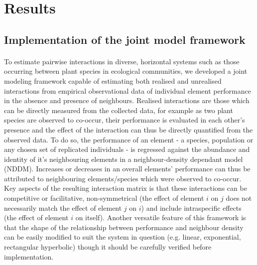 \documentclass[a4,12pt]{article}
\begin{document}
\section{Results}


    \subsection{Implementation of the joint model framework}

    \paragraph{}
        To estimate pairwise interactions in diverse, horizontal systems such as those occurring between plant species in ecological communities, we developed a joint modeling framework capable of estimating both realised and unrealised interactions from empirical observational data of individual element performance in the absence and presence of neighbours. Realised interactions are those which can be directly measured from the collected data, for example as two plant species are observed to co-occur, their performance is evaluated in each other's presence and the effect of the interaction can thus be directly quantified from the observed data. To do so, the performance of an element - a species, population or any chosen set of replicated individuals - is regressed against the abundance and identity of it's neighbouring elements in a neighbour-density dependant model (NDDM).  Increases or decreases in an overall elements' performance can thus be attributed to neighbouring elements/species which were observed to co-occur. Key aspects of the resulting interaction matrix is that these interactions can be competitive or facilitative, non-symmetrical (the effect of element $i$ on $j$ does not necessarily match the effect of element $j$ on $i$) and include intraspecific effects (the effect of element $i$ on itself). Another versatile feature of this framework is that the shape of the relationship between performance and neighbour density can be easily modified to suit the system in question (e.g. linear, exponential, rectangular hyperbolic) though it should be carefully verified before implementation. 
\end{document}
